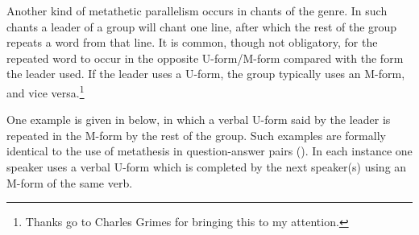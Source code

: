 \begin{exe}
	\label{ex:130825-3, 1.21 ch:ConCon}
		\label{ex:MsimoMaMtoup}
\end{exe}

Another kind of metathetic parallelism occurs in chants of the  genre.
In such chants a leader of a group will chant one line,
after which the rest of the group repeats a word from that line.
It is common, though not obligatory, for the repeated word 
to occur in the opposite U-form/M-form compared with the form the leader used.
If the leader uses a U-form, the group typically uses an M-form, and vice versa.\footnote{
		Thanks go to Charles Grimes for bringing this to my attention.}

One example is given in  below,
in which a verbal U-form said by the leader
is repeated in the M-form by the rest of the group.
Such examples are formally identical to the use of metathesis
in question-answer pairs ().
In each instance one speaker uses a verbal U-form which is completed
by the next speaker(s) using an M-form of the same verb.

